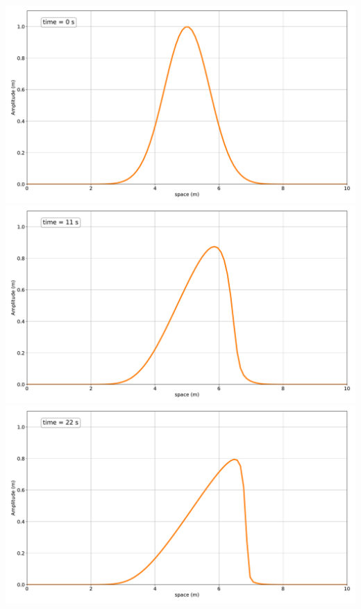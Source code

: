 %
%
%

\includegraphics[width=\linewidth]{../BurgersEquation/images/Nonlinear_Convection0.pdf}
\includegraphics[width=\linewidth]{../BurgersEquation/images/Nonlinear_Convection1.pdf}
\includegraphics[width=\linewidth]{../BurgersEquation/images/Nonlinear_Convection2.pdf}
